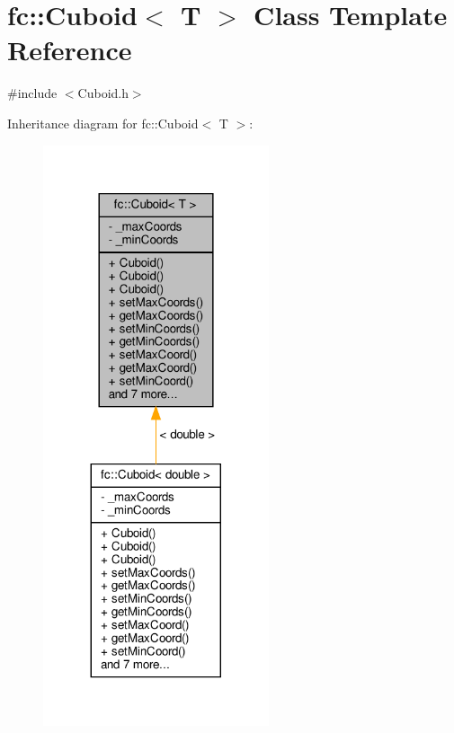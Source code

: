 \hypertarget{classfc_1_1Cuboid}{}\section{fc\+:\+:Cuboid$<$ T $>$ Class Template Reference}
\label{classfc_1_1Cuboid}


{\ttfamily \#include $<$Cuboid.\+h$>$}



Inheritance diagram for fc\+:\+:Cuboid$<$ T $>$\+:
\nopagebreak
\begin{figure}[H]
\begin{center}
\leavevmode
\includegraphics[width=188pt]{d4/dcb/classfc_1_1Cuboid__inherit__graph}
\end{center}
\end{figure}


